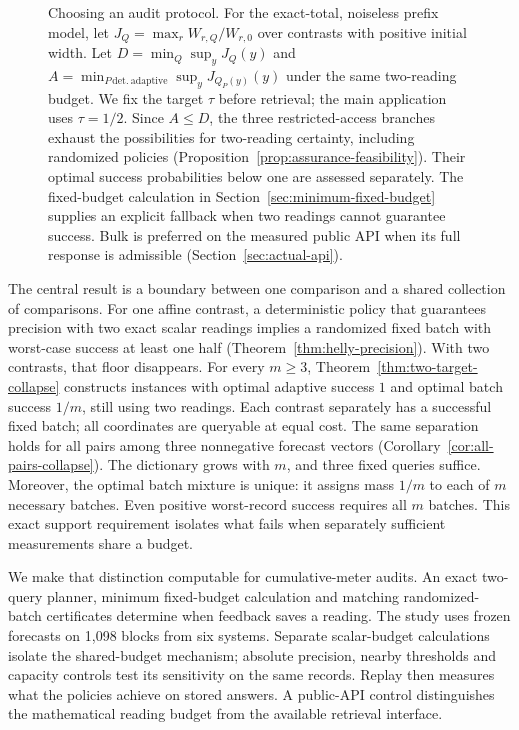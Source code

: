 \documentclass[12pt]{article}
\begin{document}
\begin{figure}[htbp]
\caption{Choosing an audit protocol. For the exact-total, noiseless prefix
model, let $J_Q=\max_r W_{r,Q}/W_{r,0}$ over contrasts with positive initial
width. Let $D=\min_Q\sup_y J_Q(y)$ and
$A=\min_{P\,\mathrm{det.\ adaptive}}\sup_y J_{Q_P(y)}(y)$ under the same
two-reading budget. We fix the target $\tau$ before retrieval; the main
application uses $\tau=1/2$. Since $A\leq D$, the three restricted-access
branches exhaust the possibilities for two-reading certainty, including randomized
policies (Proposition~\ref{prop:assurance-feasibility}). Their optimal
success probabilities below one are assessed separately. The fixed-budget
calculation in Section~\ref{sec:minimum-fixed-budget} supplies an explicit
fallback when two readings cannot guarantee success. Bulk is preferred on the measured public
API when its full response is admissible (Section~\ref{sec:actual-api}).}
\label{fig:audit-workflow}
\end{figure}

The central result is a boundary between one comparison and a shared
collection of comparisons. For one affine contrast, a deterministic policy
that guarantees precision with two exact scalar readings implies a
randomized fixed batch with worst-case success at least one half
(Theorem~\ref{thm:helly-precision}). With two contrasts, that floor disappears.
For every $m\geq3$, Theorem~\ref{thm:two-target-collapse} constructs instances
with optimal adaptive success $1$ and optimal batch success $1/m$, still
using two readings. Each contrast separately has a successful fixed batch;
all coordinates are queryable at equal cost. The same separation holds for
all pairs among three nonnegative forecast vectors
(Corollary~\ref{cor:all-pairs-collapse}). The dictionary grows with $m$,
and three fixed queries suffice. Moreover, the optimal batch mixture is
unique: it assigns mass $1/m$ to each of $m$ necessary batches. Even positive
worst-record success requires all $m$ batches. This exact support requirement
isolates what fails when separately sufficient measurements share a budget.

We make that distinction computable for cumulative-meter audits. An exact
two-query planner, minimum fixed-budget calculation and matching randomized-batch
certificates determine when feedback saves a reading. The study uses frozen
forecasts on 1,098 blocks from six systems. Separate scalar-budget calculations
isolate the shared-budget mechanism; absolute precision, nearby thresholds
and capacity controls test its sensitivity on the same records. Replay then
measures what the policies achieve on stored answers. A public-API control
distinguishes the mathematical reading budget from the available retrieval
interface.
\end{document}
